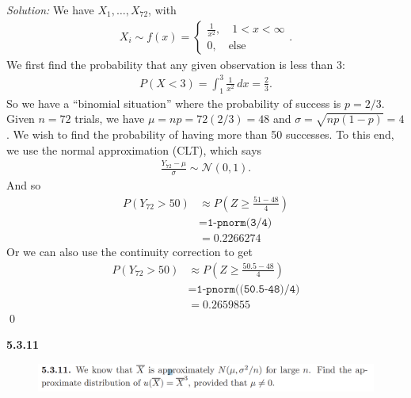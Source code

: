 \documentclass{book}
\theoremstyle{definition}
\newcommand{\nn}{\nonumber}
\newcommand{\N}{\mathcal{N}}
\newcommand{\f}[2]{\frac{#1}{#2}}
\newcommand{\lp}{\left(}
\newcommand{\rp}{\right)}
\begin{document}
\noindent \textit{Solution:} We have $X_1, \dots, X_{72}$, with 
\begin{align}
X_i \sim f(x) = \begin{cases}
\f{1}{x^2}, \quad 1 < x < \infty\\
0, \quad \text{else}
\end{cases}.
\end{align}
We first find the probability that any given observation is less than 3:
\begin{align}
P(X < 3) = \int_1^3 \f{1}{x^2}\,dx = \f{2}{3}.
\end{align}
So we have a ``binomial situation'' where the probability of success is $p=2/3$. Given $n=72$ trials, we have $\mu = np = 72(2/3) = 48$ and $\sigma = \sqrt{np(1-p)} = 4$. We wish to find the probability of having more than 50 successes. To this end, we use the normal approximation (CLT), which says
\begin{align}
\f{Y_{72} - \mu}{\sigma} \sim \N(0,1).
\end{align}
And so
\begin{align}
P(Y_{72} > 50) &\approx P\lp Z \geq \f{51 - 48}{4}  \rp\nn\\
&= \texttt{1-pnorm(3/4)}\nn\\
&= \boxed{0.2266274}
\end{align}
Or we can also use the continuity correction to get
\begin{align}
P(Y_{72} > 50) &\approx P\lp Z \geq \f{50.5 - 48}{4}  \rp\nn\\
&= \texttt{1-pnorm((50.5-48)/4)}\nn\\
&= \boxed{0.2659855}
\end{align}
\qed












\newpage




\noindent \textbf{5.3.11}
\begin{figure}[!htb]
	\includegraphics[scale=0.25]{5311}
\end{figure}
\end{document}
